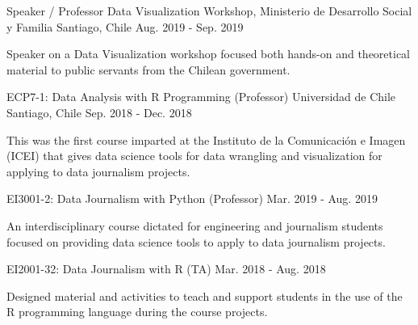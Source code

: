 

\begin{cventries}

  \cventry
    {Speaker / Professor} %
    {Data Visualization Workshop, Ministerio de Desarrollo Social y Familia} %
    {Santiago, Chile} %
    {Aug. 2019 - Sep. 2019} %
    {
      \begin{cvitems} %
        \item {Speaker on a Data Visualization workshop focused both hands-on and theoretical material to public servants from the Chilean government.}
      \end{cvitems}
    }
   
  \cventrytwopositions
    {ECP7-1: Data Analysis with R Programming (Professor)}
    {Universidad de Chile}
    {Santiago, Chile}
    {Sep. 2018 - Dec. 2018}
    {
      \begin{cvitems}
        \item {This was the first course imparted at the Instituto de la Comunicación e Imagen (ICEI) that gives data science tools for data wrangling and visualization for applying to data journalism projects.}      
      \end{cvitems}
    }
    {EI3001-2: Data Journalism with Python (Professor)}
    {Mar. 2019 - Aug. 2019}
    {
      \begin{cvitems}
        \item {An interdisciplinary course dictated for engineering and journalism students focused on providing data science tools to apply to data journalism projects.}
      \end{cvitems}
    }

  \cventry
    {EI2001-32: Data Journalism with R (TA)} %
    {} %
    {} %
    {Mar. 2018 - Aug. 2018} %
    {
      \begin{cvitems} %
        \item {Designed material and activities to teach and support students in the use of the R programming language during the course projects.}
      \end{cvitems}
    }


\end{cventries}

